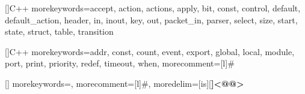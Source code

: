 % 

\usepackage[utf8]{inputenc}   %

\usepackage{graphicx}         %
\usepackage{svg}

\usepackage{times}            %

\usepackage[alf,abnt-emphasize=bf]{abntex2cite}	%

% 

\usepackage{csquotes}
\usepackage{hyperref}
\usepackage{subcaption}
\usepackage{float}
\usepackage{blindtext}

% 
% 
\usepackage{listings}

[]{C++}{
    morekeywords={accept, action, actions, apply, bit, const, control, default, default_action, header, in, inout, key, out, packet_in, parser, select, size, start, state, struct, table, transition}
}

[]{C++}{
    morekeywords={addr, const, count, event, export, global, local, module, port, print, priority, redef, timeout, when},
    morecomment=[l]{\#}
}

[]{}{
    morekeywords={},
    morecomment=[l]{\#},
    moredelim=[is][\bfseries]{<@}{@>}
}




